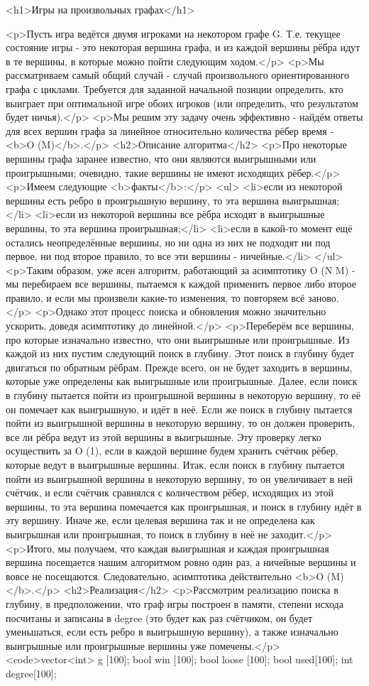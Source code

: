 <h1>Игры на произвольных графах</h1>

<p>Пусть игра ведётся двумя игроками на некотором графе G. Т.е. текущее состояние игры - это некоторая вершина графа, и из каждой вершины рёбра идут в те вершины, в которые можно пойти следующим ходом.</p>
<p>Мы рассматриваем самый общий случай - случай произвольного ориентированного графа с циклами. Требуется для заданной начальной позиции определить, кто выиграет при оптимальной игре обоих игроков (или определить, что результатом будет ничья).</p>
<p>Мы решим эту задачу очень эффективно - найдём ответы для всех вершин графа за линейное относительно количества рёбер время - <b>O (M)</b>.</p>
<h2>Описание алгоритма</h2>
<p>Про некоторые вершины графа заранее известно, что они являются выигрышными или проигрышными; очевидно, такие вершины не имеют исходящих рёбер.</p>
<p>Имеем следующие <b>факты</b>:</p>
<ul>
<li>если из некоторой вершины есть ребро в проигрышную вершину, то эта вершина выигрышная;</li>
<li>если из некоторой вершины все рёбра исходят в выигрышные вершины, то эта вершина проигрышная;</li>
<li>если в какой-то момент ещё остались неопределённые вершины, но ни одна из них не подходят ни под первое, ни под второе правило, то все эти вершины - ничейные.</li>
</ul>
<p>Таким образом, уже ясен алгоритм, работающий за асимптотику O (N M) - мы перебираем все вершины, пытаемся к каждой применить первое либо второе правило, и если мы произвели какие-то изменения, то повторяем всё заново.</p>
<p>Однако этот процесс поиска и обновления можно значительно ускорить, доведя асимптотику до линейной.</p>
<p>Переберём все вершины, про которые изначально известно, что они выигрышные или проигрышные. Из каждой из них пустим следующий поиск в глубину. Этот поиск в глубину будет двигаться по обратным рёбрам. Прежде всего, он не будет заходить в вершины, которые уже определены как выигрышные или проигрышные. Далее, если поиск в глубину пытается пойти из проигрышной вершины в некоторую вершину, то её он помечает как выигрышную, и идёт в неё. Если же поиск в глубину пытается пойти из выигрышной вершины в некоторую вершину, то он должен проверить, все ли рёбра ведут из этой вершины в выигрышные. Эту проверку легко осуществить за O (1), если в каждой вершине будем хранить счётчик рёбер, которые ведут в выигрышные вершины. Итак, если поиск в глубину пытается пойти из выигрышной вершины в некоторую вершину, то он увеличивает в ней счётчик, и если счётчик сравнялся с количеством рёбер, исходящих из этой вершины, то эта вершина помечается как проигрышная, и поиск в глубину идёт в эту вершину. Иначе же, если целевая вершина так и не определена как выигрышная или проигрышная, то поиск в глубину в неё не заходит.</p>
<p>Итого, мы получаем, что каждая выигрышная и каждая проигрышная вершина посещается нашим алгоритмом ровно один раз, а ничейные вершины и вовсе не посещаются. Следовательно, асимптотика действительно <b>O (M)</b>.</p>
<h2>Реализация</h2>
<p>Рассмотрим реализацию поиска в глубину, в предположении, что граф игры построен в памяти, степени исхода посчитаны и записаны в degree (это будет как раз счётчиком, он будет уменьшаться, если есть ребро в выигрышную вершину), а также изначально выигрышные или проигрышные вершины уже помечены.</p>
<code>vector<int> g [100];
bool win [100];
bool loose [100];
bool used[100];
int degree[100];

